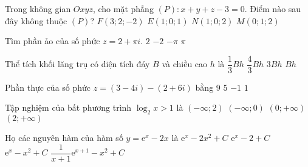 \begin{ex}%
	Trong không gian $Oxyz$, cho mặt phẳng $(P) \colon x+y+z-3=0$. Điểm nào sau đây không thuộc $(P)$?
	\choice
	{$F(3;2;-2)$}
	{\True $E(1;0;1)$}
	{$N(1;0;2)$}
	{$M(0;1;2)$}
\end{ex}


\begin{ex}%
	Tìm phần ảo của số phức $z=2+\pi i$.
	\choice
	{$2$}
	{$-2$}
	{$-\pi$}
	{\True $\pi$}
\end{ex}


\begin{ex}%
	Thể tích khối lăng trụ có diện tích đáy $B$ và chiều cao $h$ là
	\choice
	{$\dfrac{1}{3}Bh$}
	{$\dfrac{4}{3}Bh$}
	{$3Bh$}
	{\True $Bh$}
\end{ex}


\begin{ex}%
	Phần thực của số phức $z=(3-4i)-(2+6i)$ bằng
	\choice
	{$9$}
	{$5$}
	{$-1$}
	{\True $1$}
\end{ex}


\begin{ex}%
	Tập nghiệm của bất phương trình $\log _2x>1$ là
	\choice
	{$(-\infty;2)$}
	{$(-\infty;0)$}
	{$(0;+\infty)$}
	{\True $(2;+\infty)$}
\end{ex}


\begin{ex}%
	Họ các nguyên hàm của hàm số $y=\mathrm{e}^x-2x$ là
	\choice
	{$\mathrm{e}^x-2x^2+C$}
	{$\mathrm{e}^x-2+C$}
	{\True $\mathrm{e}^x-x^2+C$}
	{$\dfrac{1}{x+1}\mathrm{e}^{x+1}-x^2+C$}
\end{ex}


